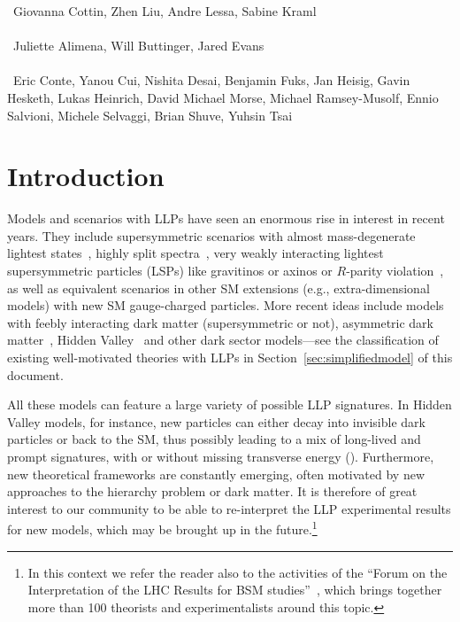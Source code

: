 ~Giovanna Cottin, Zhen Liu, Andre Lessa, Sabine Kraml\\
\text{ \; }\\
~Juliette Alimena, Will Buttinger, Jared Evans\\
\text{ \; }\\
~Eric Conte, Yanou Cui, Nishita Desai, Benjamin Fuks, Jan Heisig, Gavin Hesketh, Lukas Heinrich,  David Michael Morse, Michael Ramsey-Musolf, Ennio Salvioni, Michele Selvaggi, Brian Shuve, Yuhsin Tsai
\text{ \; }\\

\section{Introduction}
\label{sec:ch5-introduction}

Models and scenarios with LLPs have seen an enormous rise in interest in recent years.
They include supersymmetric scenarios with almost mass-degenerate lightest states~\cite{Chen:1995yu,Feng:1999fu}, 
highly split spectra~\cite{ArkaniHamed:2004fb,Giudice:2004tc}, very weakly interacting 
lightest supersymmetric particles (LSPs) like gravitinos or 
axinos \cite{Pagels:1981ke,Covi:1999ty} or $R$-parity violation~\cite{Barbier:2004ez}, 
as well as equivalent scenarios in other SM extensions (e.g., extra-dimensional models) with new SM gauge-charged particles. 
More recent ideas include models with feebly interacting dark matter \cite{Hall:2009bx} (supersymmetric or not), asymmetric dark matter~\cite{Zurek:2013wia}, Hidden Valley~\cite{Strassler:2006im} and other dark sector models---see the classification of existing well-motivated theories with LLPs in Section~\ref{sec:simplifiedmodel} of this document.

All these models can feature a large variety of possible LLP signatures. In Hidden Valley models, for instance,   
new particles can either decay into invisible dark particles or back to the SM, thus possibly leading to a 
mix of long-lived and prompt signatures, with or without missing transverse energy (\MET). 
Furthermore, new theoretical frameworks are constantly emerging, often motivated by 
new approaches to the hierarchy problem or dark matter. 
It is therefore of great interest to our community to be able to 
re-interpret the LLP experimental results 
for new models, which may be brought up in the future.\footnote{In this context we refer the reader also to 
the activities of the ``Forum on the Interpretation of the LHC Results for BSM studies''~\cite{reinterpretationForum}, which brings together more than 100 theorists and experimentalists around this topic.}

